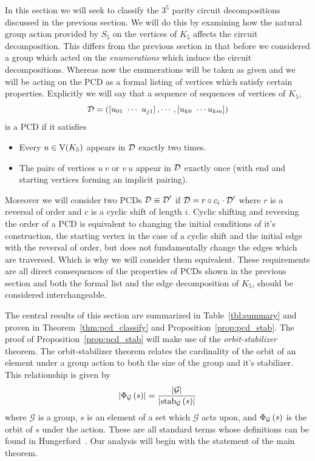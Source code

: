 In this section we will seek to classify the $3^5$ parity circuit decompositions discussed in the previous section. We will do this by examining how the natural group action provided by $S_5$ on the vertices of $K_5$ affects the circuit decomposition. This differs from the previous section in that before we considered a group which acted on the {\em enumerations} which induce the circuit decompositions. Whereas now the enumerations will be taken as given and we will be acting on the PCD as a formal listing of vertices which satisfy certain properties. Explicitly we will say that a sequence of sequences of vertices of $K_5$, \[ \pcd  = \left(\left[u_{01}\  \cdots\  u_{j1}\right], \cdots ,\left[u_{k0}\ \cdots u_{km}  \right]\right)  \] is a PCD if it satisfies
\begin{itemize}
\item Every $u \in \mathrm{V}(K_5)$ appears in $\operatorname{\mathcal{D}}$ exactly two times.
\item The pairs of vertices  $u\ v$ or $v \ u$ appear in  $\operatorname{\mathcal{D}}$ exactly once (with end and starting vertices forming an implicit pairing). 
\end{itemize}
\noindent
Moreover we will consider two PCDs $\operatorname{\mathcal{D}} \equiv \operatorname{\mathcal{D}}^{\prime}$ if $\operatorname{\mathcal{D}} = r \circ c_{i} \cdot \operatorname{\mathcal{D}}^{\prime}$ where $r$ is a reversal of order and $c$ is a cyclic shift of length $i$. Cyclic shifting and reversing the order of a PCD is equivalent to changing the initial conditions of it's construction, the starting vertex in the case of a cyclic shift and the initial edge with the reversal of order, but does not fundamentally change the edges which are traversed. Which is why we will consider them equivalent. These requirements are all direct consequences of the properties of PCDs shown in the previous section and both the formal list and the edge decomposition of $K_5$, should be considered interchangeable.


The central results of this section are summarized in Table~\ref{tbl:summary} and proven in Theorem~\ref{thm:pcd_classify} and Proposition~\ref{prop:pcd_stab}. The proof of Proposition~\ref{prop:pcd_stab} will make use of the {\em orbit-stabilizer} theorem. The orbit-stabilizer theorem relates the cardinality of the orbit of an element under a group action to both the size of the group and it's stabilizer. This relationship is given by \[ \left\vert \operatorname{\mathrm{\Phi}}_{\mathcal{G}}\left(s \right) \right\vert = \frac{\left\vert \mathcal{G} \right\vert}{\left\vert \operatorname{\mathrm{stab}}_{\mathcal{G}}\left(s \right) \right\vert}   \] where $\mathcal{G}$ is a group, $s$ is an element of a set which $\mathcal{G}$ acts upon, and $\operatorname{\mathrm{\Phi}}_{\mathcal{G}}\left(s \right)$ is the orbit of $s$ under the action. These are all standard terms whose definitions can be found in Hungerford~\cite{Hungerford:1974zr}. Our analysis will begin with the statement of the main theorem. 

